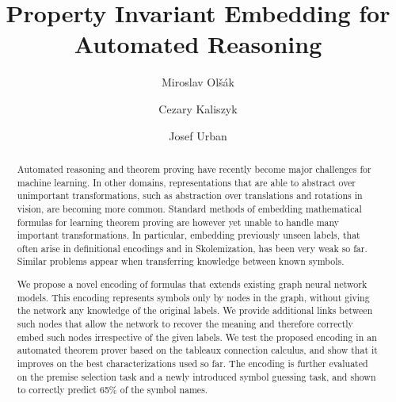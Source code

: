 \documentclass{ecai}
\begin{document}
\title{Property Invariant Embedding for Automated Reasoning}

\author{
  Miroslav Ol\v s\'ak
\and
  Cezary Kaliszyk
\and
  Josef Urban
}

\maketitle


\begin{abstract}
Automated reasoning and theorem proving have recently become major challenges
for machine learning. In other domains, representations that are able
to abstract over unimportant transformations, such as abstraction over
translations and rotations in vision, are becoming more common.
Standard methods of embedding mathematical formulas for learning theorem proving
are however yet unable to handle many important transformations. In particular, embedding previously unseen
labels, that often arise in definitional encodings and in Skolemization, has been very weak so far. Similar problems appear when transferring knowledge between known symbols.

We propose a novel encoding of formulas that extends existing graph neural
network models. This encoding represents symbols  only by nodes
in the graph, without giving the network any knowledge of the original
labels. We provide additional links between such nodes that allow the
network to recover the meaning and therefore correctly embed such nodes
irrespective of the given labels. We test the proposed encoding in an
automated theorem prover
based on the tableaux connection calculus,
and show that it improves on the best characterizations used
so far.  The encoding is further evaluated on the premise selection task and a newly introduced symbol guessing task,
and shown to correctly predict 65\% of the symbol names.
\end{abstract}
\end{document}
